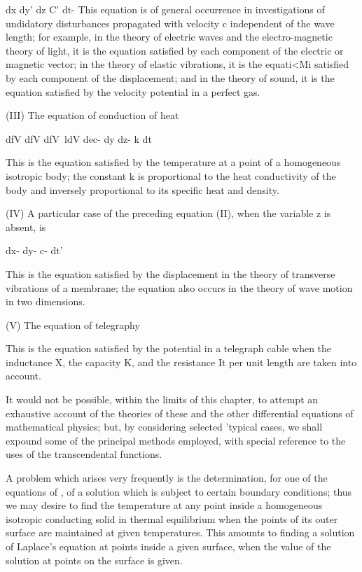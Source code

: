 dx dy' dz C' dt- This equation is of general occurrence in
investigations of undidatory disturbances propagated with velocity c
independent of the wave length; for example, in the theory of
electric waves and the electro-magnetic theory of light, it is the
equation satisfied by each component of the electric or magnetic
vector; in the theory of elastic vibrations, it is the equati<Mi
satisfied by each component of the displacement; and in the theory of
sound, it is the equation satisfied by the velocity potential in a
perfect gas.

%
%

(III) The equation of conduction of heat

dfV dfV dfV\ ldV dec- dy dz- k dt

This is the equation satisfied by the temperature at a point of a
homogeneous isotropic body; the constant k is proportional to the
heat conductivity of the body and inversely proportional to its
specific heat and density.

(IV) A particular case of the preceding equation (II), when the
variable z is absent, is

dx- dy- c- dt'

This is the equation satisfied by the displacement in the theory of
transverse vibrations of a membrane; the equation also occurs in the
theory of wave motion in two dimensions.

(V) The equation of telegraphy

This is the equation satisfied by the potential in a telegraph cable
when the inductance X, the capacity K, and the resistance It per unit
length are taken into account.

It would not be possible, within the limits of this chapter, to
attempt an exhaustive account of the theories of these and the other
differential equations of mathematical physics; but, by considering
selected 'typical cases, we shall expound some of the principal
methods employed, with special reference to the uses of the
transcendental functions.


A problem which arises very frequently is the determination, for one
of the equations of , of a solution which is subject to certain
boundary conditions; thus we may desire to find the temperature at
any point inside a homogeneous isotropic conducting solid in thermal
equilibrium when the points of its outer surface are maintained at
given temperatures. This amounts to finding a solution of Laplace's
equation at points inside a given surface, when the value of the
solution at points on the surface is given.

